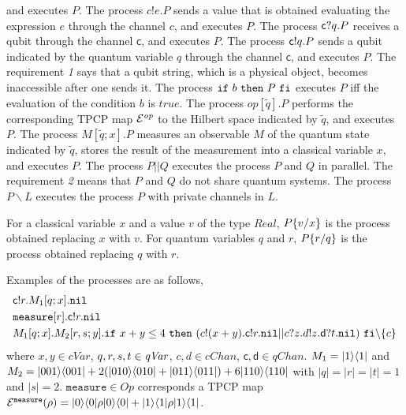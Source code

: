 and executes $P$. The process
$c!e.P$ sends a value that is obtained evaluating the
expression $e$ through the channel $c$, and executes $P$. The process
$\mathsf{c}? q.P$
receives a qubit through the channel $\mathsf{c}$, and executes $P$.
The process $\mathsf{c}! q.P$
sends a qubit indicated by the quantum variable $q$ through the channel
$\mathsf{c}$, and executes $P$. The requirement {\it 1} says that
a qubit string, which is a physical object, becomes inaccessible after one
sends it.
The process $\mathtt{if}~b~\mathtt{then}~P~\mathtt{fi}$ executes $P$ iff the evaluation of the 
condition $b$ is $\mathit{true}$. The process
$\mathit{op}[\tilde q].P$ performs the corresponding 
TPCP map $\mathcal{E}^{\mathit{op}}$ to
the Hilbert space indicated by $\tilde q$, and executes $P$.
The process $M[\tilde q;x].P$ measures an observable $M$ of
the quantum state indicated by $\tilde q$, stores the result of the
measurement into a classical variable $x$, and executes $P$. 
The process $P||Q$ executes the process $P$ and $Q$ in parallel.
The requirement {\it 2} means that $P$ and $Q$ do not share quantum
systems.
The process $P \backslash L$ executes the process $P$ with private 
channels in $L$. 

For a classical variable $x$ and a value $v$ of
the type $\mathit{Real}$, $P\{v / x\}$ is the process obtained
replacing $x$ with $v$.
For quantum variables $q$ and $r$,
$P\{r / q\}$ is the process obtained
replacing $q$ with $r$.

\begin{ex} Examples of the processes are as follows,
\label{symqccs:processex}
 \begin{align*}
  &\mathsf{c}! r. M_1[q;x].\mathtt{nil}\\
  &\mathtt{measure}[r]. \mathsf{c}! r. \mathtt{nil}\\
  &M_1[q;x].M_2[r,s;y].\mathtt{if}~x + y \le
	4~\mathtt{then}~(c!(x+y).\mathsf{c}! r.\mathtt{nil}||
	c?z.d!z.\mathsf{d}? t.\mathtt{nil})~\mathtt{fi}\backslash\{c\}
 \end{align*}
where $x, y \in \mathit{cVar}$, $q,r,s,t \in \mathit{qVar}$, $c, d \in
 \mathit{cChan}$, $\mathsf{c}, \mathsf{d} \in
 \mathit{qChan}$. $M_1 = |1\rangle\langle 1|$ and
 $M_2 = |001\rangle\langle 001| + 2(|010\rangle\langle 010|
 + |011\rangle\langle 011|)
 + 6|110\rangle\langle 110|$
 with $|q|=|r|=|t|=1$ and $|s|=2$.
 $\mathtt{measure} \in \mathit{Op}$ corresponds a 
 TPCP map
 $\mathcal{E}^{\mathtt{measure}}(\rho) = |0\rangle\langle 0|\rho|0\rangle\langle 0| +
|1\rangle\langle 1|\rho|1\rangle\langle 1|$.
\end{ex}

